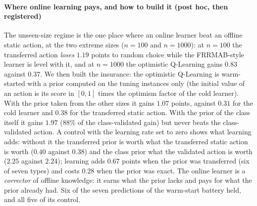 \paragraph{Where online learning pays, and how to build it (post hoc, then registered)} The unseen-size regime is the one place where an online learner beat an offline static action, at the two extreme sizes ($n=100$ and $n=1000$): at $n=100$ the transferred action \emph{loses} $1.19$ points to random choice while the FRRMAB-style learner is level with it, and at $n=1000$ the optimistic Q-Learning gains $0.83$ against $0.37$. We then built the insurance: the optimistic Q-Learning is warm-started with a prior computed on the tuning instances only (the initial value of an action is its score in $[0,1]$ times the optimism factor of the cold learner). With the prior taken from the other sizes it gains $1.07$ points, against $0.31$ for the cold learner and $0.38$ for the transferred static action. With the prior of the class itself it gains $1.97$ ($88\%$ of the class-validated gain) but never beats the class-validated action. A control with the learning rate set to zero shows what learning adds: without it the transferred prior is worth what the transferred static action is worth ($0.40$ against $0.38$) and the class prior what the validated action is worth ($2.25$ against $2.24$); learning adds $0.67$ points when the prior was transferred (six of seven types) and costs $0.28$ when the prior was exact. The online learner is a \emph{corrector} of offline knowledge: it earns what the prior lacks and pays for what the prior already had. Six of the seven predictions of the warm-start battery held, and all five of its control.

